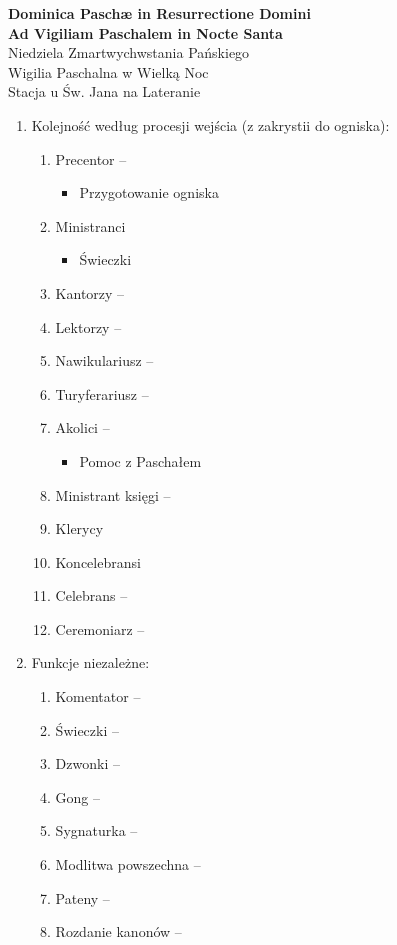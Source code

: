 \documentclass[10pt,oneside,final,notitlepage,a4paper,wide]{mwart}
\begin{document}
%
\begin{center}
	\LARGE{\textbf{Dominica Paschæ in Resurrectione Domini\\Ad Vigiliam Paschalem in Nocte Santa}}\\ \smallskip
	\small{Niedziela Zmartwychwstania Pańskiego\\Wigilia Paschalna w Wielką Noc\\ \smallskip Stacja u Św. Jana na Lateranie}
\end{center} \vspace{1cm}

\begin{enumerate}
	\item Kolejność według procesji wejścia (z zakrystii do ogniska):
	\begin{enumerate}
		\item Precentor --
			\begin{itemize}
				\item Przygotowanie ogniska
			\end{itemize}
		\item Ministranci
			\begin{itemize}
				\item Świeczki
			\end{itemize}
		\item Kantorzy -- 
		\item Lektorzy -- 
		\item Nawikulariusz -- 
		\item Turyferariusz --
		\item Akolici --
			\begin{itemize}
				\item Pomoc z Paschałem
			\end{itemize}
		\item Ministrant księgi --
		\item Klerycy
		\item Koncelebransi
		\item Celebrans -- 
		\item Ceremoniarz -- 
\smallskip
	\end{enumerate}
	\item Funkcje niezależne:
	\begin{enumerate}
		\item Komentator --
		\item Świeczki --
		\item Dzwonki -- 
		\item Gong -- 
		\item Sygnaturka -- 
		\item Modlitwa powszechna -- 
		\item Pateny --
		\item Rozdanie kanonów --
	\end{enumerate}
\end{enumerate}
\end{document}
